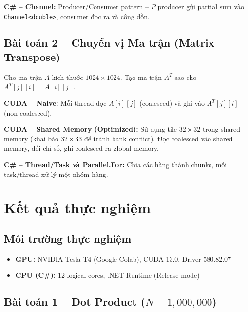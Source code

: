 \documentclass[12pt,a4paper]{article}
\begin{document}
\textbf{C\# -- Channel:} Producer/Consumer pattern -- $P$ producer gửi partial sum vào \texttt{Channel<double>}, consumer đọc ra và cộng dồn.

\subsection{Bài toán 2 -- Chuyển vị Ma trận (Matrix Transpose)}

Cho ma trận $A$ kích thước $1024 \times 1024$. Tạo ma trận $A^T$ sao cho $A^T[j][i] = A[i][j]$.

\textbf{CUDA -- Naive:} Mỗi thread đọc $A[i][j]$ (coalesced) và ghi vào $A^T[j][i]$ (non-coalesced).

\textbf{CUDA -- Shared Memory (Optimized):} Sử dụng tile $32 \times 32$ trong shared memory (khai báo $32 \times 33$ để tránh bank conflict). Đọc coalesced vào shared memory, đổi chỉ số, ghi coalesced ra global memory.

\textbf{C\# -- Thread/Task và Parallel.For:} Chia các hàng thành chunks, mỗi task/thread xử lý một nhóm hàng.

\section{Kết quả thực nghiệm}

\subsection{Môi trường thực nghiệm}
\begin{itemize}[nosep]
    \item \textbf{GPU:} NVIDIA Tesla T4 (Google Colab), CUDA 13.0, Driver 580.82.07
    \item \textbf{CPU (C\#):} 12 logical cores, .NET Runtime (Release mode)
\end{itemize}

\subsection{Bài toán 1 -- Dot Product ($N = 1{,}000{,}000$)}
\end{document}
